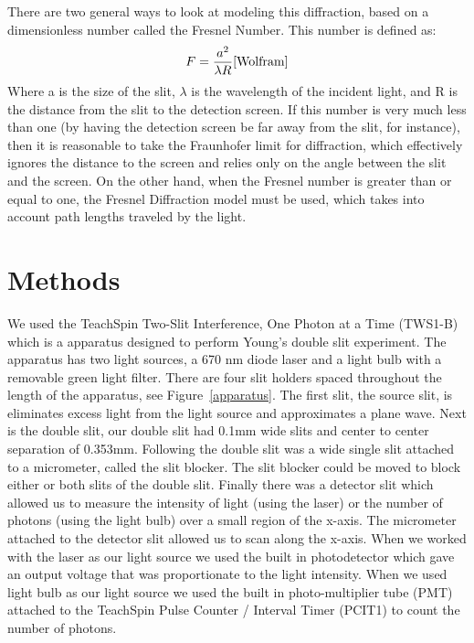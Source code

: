 \documentclass[prb,preprint]{revtex4-1}
\begin{document}
There are two general ways to look at modeling this diffraction, based on a dimensionless number called the Fresnel Number.\cite{Wolfram} This number is defined as:
\begin{equation}
\label{DblIntfr}
F = \frac{a^2}{\lambda R}\cite{Wolfram}
\end{equation}
Where a is the size of the slit, $\lambda$ is the wavelength of the incident light, and R is the distance from the slit to the detection screen. If this number is very much less than one (by having the detection screen be far away from the slit, for instance), then it is reasonable to take the Fraunhofer limit for diffraction, which effectively ignores the distance to the screen and relies only on the angle between the slit and the screen.\cite{Wolfram} On the other hand, when the Fresnel number is greater than or equal to one, the Fresnel Diffraction model must be used, which takes into account path lengths traveled by the light.\cite{Wolfram} 

\section{Methods}

We used the TeachSpin Two-Slit Interference, One Photon at a Time (TWS1-B) which is a apparatus designed to perform Young's double slit experiment. The apparatus has two light sources, a 670 nm diode laser and a light bulb with a removable green light filter. There are four slit holders spaced throughout the length of the apparatus, see Figure~\ref{apparatus}. The first slit, the source slit, is eliminates excess light from the light source and approximates a plane wave. Next is the double slit, our double slit had 0.1mm wide slits and center to center separation of 0.353mm. Following the double slit was a wide single slit attached to a micrometer, called the slit blocker. The slit blocker could be moved to block either or both slits of the double slit. Finally there was a detector slit which allowed us to measure the intensity of light (using the laser) or the number of photons (using the light bulb) over a small region of the x-axis. The micrometer attached to the detector slit allowed us to scan along the x-axis. When we worked with the laser as our light source we used the built in photodetector which gave an output voltage that was proportionate to the light intensity. When we used light bulb as our light source we used the built in photo-multiplier tube (PMT) attached to the TeachSpin Pulse Counter / Interval Timer (PCIT1) to count the number of photons.
\end{document}
